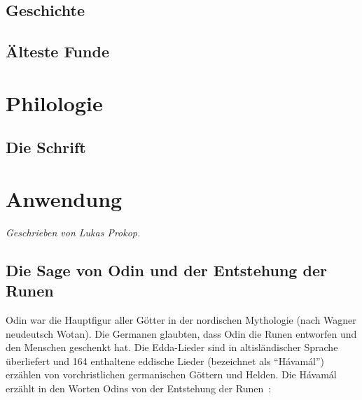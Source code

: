 \documentclass[a4paper]{scrartcl}
\begin{document}
\subsection{Geschichte}
\subsection{Älteste Funde}
\section{Philologie}
\subsection{Die Schrift}

\newpage

\section{Anwendung}
\emph{Geschrieben von Lukas Prokop.}

\subsection{Die Sage von Odin und der Entstehung der Runen}
%
Odin war die Hauptfigur aller Götter in der nordischen Mythologie (nach Wagner neudeutsch \glqq Wotan\grqq). Die Germanen glaubten, dass Odin die Runen entworfen und den Menschen geschenkt hat. Die Edda-Lieder sind in altisländischer Sprache überliefert und 164 enthaltene eddische Lieder (bezeichnet als \enquote{Hávamál}) erzählen von vorchristlichen germanischen Göttern und Helden. Die Hávamál erzählt in den Worten Odins von der Entstehung der Runen~\cite{havamal}:
\end{document}

